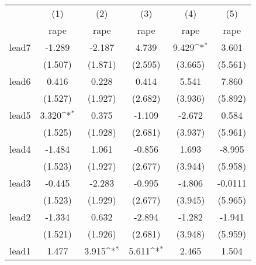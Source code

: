 {
\def\sym#1{\ifmmode^{#1}\else\(^{#1}\)\fi}
\begin{tabular}{l*{5}{c}}
\hline\hline
            &\multicolumn{1}{c}{(1)}&\multicolumn{1}{c}{(2)}&\multicolumn{1}{c}{(3)}&\multicolumn{1}{c}{(4)}&\multicolumn{1}{c}{(5)}\\
            &\multicolumn{1}{c}{rape}&\multicolumn{1}{c}{rape}&\multicolumn{1}{c}{rape}&\multicolumn{1}{c}{rape}&\multicolumn{1}{c}{rape}\\
\hline
lead7       &      -1.289         &      -2.187         &       4.739         &       9.429\sym{*}  &       3.601         \\
            &     (1.507)         &     (1.871)         &     (2.595)         &     (3.665)         &     (5.561)         \\
[1em]
lead6       &       0.416         &       0.228         &       0.414         &       5.541         &       7.860         \\
            &     (1.527)         &     (1.927)         &     (2.682)         &     (3.936)         &     (5.892)         \\
[1em]
lead5       &       3.320\sym{*}  &       0.375         &      -1.109         &      -2.672         &       0.584         \\
            &     (1.525)         &     (1.928)         &     (2.681)         &     (3.937)         &     (5.961)         \\
[1em]
lead4       &      -1.484         &       1.061         &      -0.856         &       1.693         &      -8.995         \\
            &     (1.523)         &     (1.927)         &     (2.677)         &     (3.944)         &     (5.958)         \\
[1em]
lead3       &      -0.445         &      -2.283         &      -0.995         &      -4.806         &     -0.0111         \\
            &     (1.523)         &     (1.929)         &     (2.677)         &     (3.945)         &     (5.965)         \\
[1em]
lead2       &      -1.334         &       0.632         &      -2.894         &      -1.282         &      -1.941         \\
            &     (1.521)         &     (1.926)         &     (2.681)         &     (3.948)         &     (5.959)         \\
[1em]
lead1       &       1.477         &       3.915\sym{*}  &       5.611\sym{*}  &       2.465         &       1.504         \\

\end{tabular}}
